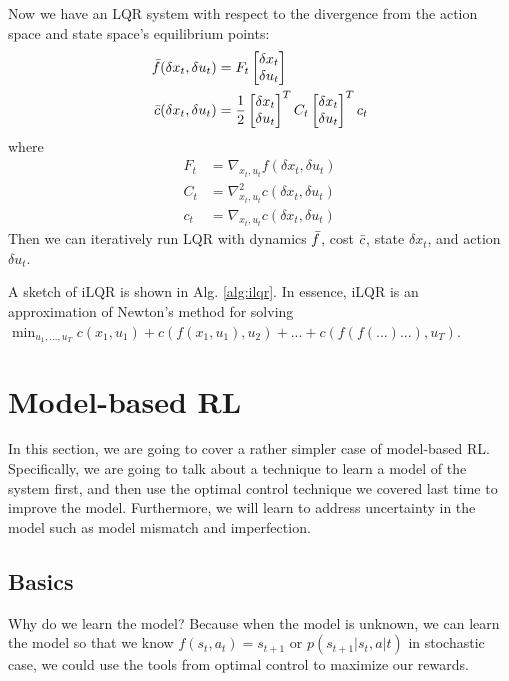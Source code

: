 Now we have an LQR system with respect to the divergence from the action space and state space's equilibrium points:
\begin{align*}
    \Bar{f}(\delta x_t, \delta u_t) &= F_t \begin{bmatrix}\delta x_t\\\delta u_t\end{bmatrix}\\
    \Bar{c}(\delta x_t, \delta u_t) &= \frac{1}{2}\begin{bmatrix}\delta x_t\\\delta u_t\end{bmatrix}^TC_t\begin{bmatrix}\delta x_t\\\delta u_t\end{bmatrix}^Tc_t
\end{align*}
where 
\begin{align*}
    F_t &= \nabla_{x_t,u_t}f(\delta x_t, \delta u_t) \\
    C_t &= \nabla^2_{x_t,u_t}c(\delta x_t, \delta u_t)\\
    c_t &= \nabla_{x_t,u_t}c(\delta x_t, \delta u_t)
\end{align*}
Then we can iteratively run LQR with dynamics $\Bar{f}$, cost $\Bar{c}$, state $\delta x_t$, and action $\delta u_t$.


A sketch of iLQR is shown in Alg. \ref{alg:ilqr}. In essence, iLQR is an approximation of Newton's method for solving $\min_{u_1,...,u_T}c(x_1,u_1) + c(f(x_1,u_1),u_2)+...+c(f(f(...)...),u_T)$.

\section{Model-based RL}
In this section, we are going to cover a rather simpler case of model-based RL. Specifically, we are going to talk about a technique to learn a model of the system first, and then use the optimal control technique we covered last time to improve the model. Furthermore, we will learn to address uncertainty in the model such as model mismatch and imperfection.
\subsection{Basics}
Why do we learn the model? Because when the model is unknown, we can learn the model so that we know $f(s_t,a_t) = s_{t+1}$ or $p(s_{t+1}|s_t,a|t)$ in stochastic case, we could use the tools from optimal control to maximize our rewards. 

